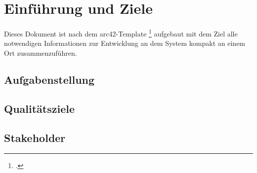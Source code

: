 \section{Einführung und Ziele}

Dieses Dokument ist nach dem arc42-Template \footcite{ARCTEMPLATE:1} aufgebaut mit dem Ziel alle notwendigen Informationen zur Entwicklung an dem System kompakt an einem Ort zusammenzuführen.

\subsection{Aufgabenstellung}

\subsection{Qualitätsziele}

\subsection{Stakeholder}

